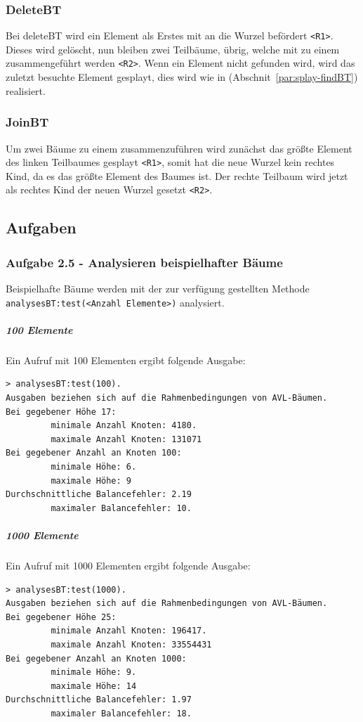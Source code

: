 \subsubsection{DeleteBT}
Bei deleteBT wird ein Element als Erstes mit  an die Wurzel befördert
\verb|<R1>|.
Dieses wird gelöscht, nun bleiben zwei Teilbäume, übrig, welche mit  zu einem
zusammengeführt werden \verb|<R2>|.
Wenn ein Element nicht gefunden wird, wird das zuletzt besuchte Element gesplayt, dies wird wie
in  (Abschnit~\ref{par:splay-findBT}) realisiert.

\subsubsection{JoinBT}\label{par:joinbt}
Um zwei Bäume zu einem zusammenzuführen wird zunächst das größte Element des linken Teilbaumes
gesplayt \verb|<R1>|, somit hat die neue Wurzel kein rechtes Kind, da es das größte Element des
Baumes ist.
Der rechte Teilbaum wird jetzt als rechtes Kind der neuen Wurzel gesetzt \verb|<R2>|.

\subsection{Aufgaben}\label{subsec:aufgaben2}

\subsubsection{Aufgabe 2.5 - Analysieren beispielhafter Bäume}
Beispielhafte Bäume werden mit der zur verfügung gestellten Methode\\
\verb|analysesBT:test(<Anzahl Elemente>)| analysiert.

\subparagraph{100 Elemente}
Ein Aufruf mit 100 Elementen ergibt folgende Ausgabe:
\begin{verbatim}
> analysesBT:test(100).
Ausgaben beziehen sich auf die Rahmenbedingungen von AVL-Bäumen.
Bei gegebener Höhe 17:
         minimale Anzahl Knoten: 4180.
         maximale Anzahl Knoten: 131071
Bei gegebener Anzahl an Knoten 100:
         minimale Höhe: 6.
         maximale Höhe: 9
Durchschnittliche Balancefehler: 2.19
         maximaler Balancefehler: 10.
\end{verbatim}

\subparagraph{1000 Elemente}
Ein Aufruf mit 1000 Elementen ergibt folgende Ausgabe:
\begin{verbatim}
> analysesBT:test(1000).
Ausgaben beziehen sich auf die Rahmenbedingungen von AVL-Bäumen.
Bei gegebener Höhe 25:
         minimale Anzahl Knoten: 196417.
         maximale Anzahl Knoten: 33554431
Bei gegebener Anzahl an Knoten 1000:
         minimale Höhe: 9.
         maximale Höhe: 14
Durchschnittliche Balancefehler: 1.97
         maximaler Balancefehler: 18.
\end{verbatim}

